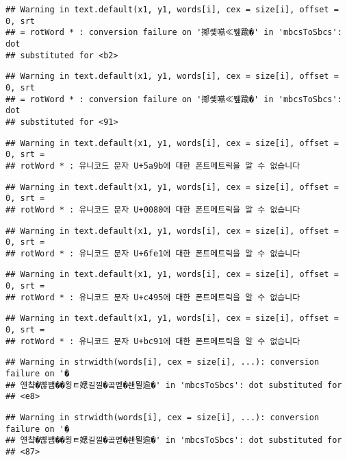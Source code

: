 \documentclass[]{article}
\begin{document}
\begin{verbatim}
## Warning in text.default(x1, y1, words[i], cex = size[i], offset = 0, srt
## = rotWord * : conversion failure on '揶쎛嚥≪뮆踰�' in 'mbcsToSbcs': dot
## substituted for <b2>
\end{verbatim}

\begin{verbatim}
## Warning in text.default(x1, y1, words[i], cex = size[i], offset = 0, srt
## = rotWord * : conversion failure on '揶쎛嚥≪뮆踰�' in 'mbcsToSbcs': dot
## substituted for <91>
\end{verbatim}

\begin{verbatim}
## Warning in text.default(x1, y1, words[i], cex = size[i], offset = 0, srt =
## rotWord * : 유니코드 문자 U+5a9b에 대한 폰트메트릭을 알 수 없습니다
\end{verbatim}

\begin{verbatim}
## Warning in text.default(x1, y1, words[i], cex = size[i], offset = 0, srt =
## rotWord * : 유니코드 문자 U+0080에 대한 폰트메트릭을 알 수 없습니다
\end{verbatim}

\begin{verbatim}
## Warning in text.default(x1, y1, words[i], cex = size[i], offset = 0, srt =
## rotWord * : 유니코드 문자 U+6fe1에 대한 폰트메트릭을 알 수 없습니다
\end{verbatim}

\begin{verbatim}
## Warning in text.default(x1, y1, words[i], cex = size[i], offset = 0, srt =
## rotWord * : 유니코드 문자 U+c495에 대한 폰트메트릭을 알 수 없습니다
\end{verbatim}

\begin{verbatim}
## Warning in text.default(x1, y1, words[i], cex = size[i], offset = 0, srt =
## rotWord * : 유니코드 문자 U+bc91에 대한 폰트메트릭을 알 수 없습니다
\end{verbatim}

\begin{verbatim}
## Warning in strwidth(words[i], cex = size[i], ...): conversion failure on '�
## 얜챸�뺞꽴��욍ㅌ媤길낄�곸몓�쇈묄逾�' in 'mbcsToSbcs': dot substituted for
## <e8>
\end{verbatim}

\begin{verbatim}
## Warning in strwidth(words[i], cex = size[i], ...): conversion failure on '�
## 얜챸�뺞꽴��욍ㅌ媤길낄�곸몓�쇈묄逾�' in 'mbcsToSbcs': dot substituted for
## <87>
\end{verbatim}
\end{document}
